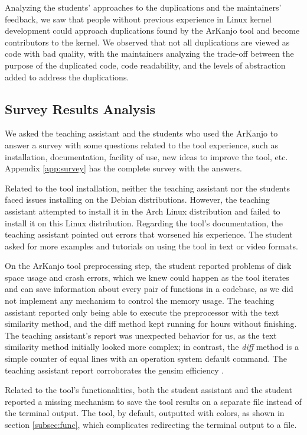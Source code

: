 Analyzing the students' approaches to the duplications and the maintainers' feedback, we saw that 
people without previous experience in Linux kernel development could approach duplications found 
by the ArKanjo tool and become contributors to the kernel. We observed that not all duplications 
are viewed as code with bad quality, with the maintainers analyzing the trade-off between the 
purpose of the duplicated code, code readability, and the levels of abstraction added to 
address the duplications.

\subsection{Survey Results Analysis}

We asked the teaching assistant and the students who used the ArKanjo to answer a survey with 
some questions related to the tool experience, such as installation, documentation, facility of 
use, new ideas to improve the tool, etc. Appendix \ref{app:survey} has the complete survey 
with the answers.

Related to the tool installation, neither the teaching assistant nor the students faced issues 
installing on the Debian distributions. However, the teaching assistant attempted to install it 
in the Arch Linux distribution and failed to install it on this Linux distribution. 
Regarding the tool's documentation, the teaching assistant pointed out errors that worsened his 
experience. The student asked for more examples and tutorials on using the tool in text or 
video formats.

On the ArKanjo tool preprocessing step, the student reported problems of disk space usage and 
crash errors, which we knew could happen as the tool iterates and can save information about 
every pair of functions in a codebase, as we did not implement any mechanism to control the 
memory usage. The teaching assistant reported only being able to execute the preprocessor with 
the text similarity method, and the diff method kept running for hours without finishing. 
The teaching assistant's report was unexpected behavior for us, as the text similarity method 
initially looked more complex; in contrast, the \textit{diff} method is a simple counter of equal lines 
with an operation system default command. The teaching assistant report corroborates the 
gensim efficiency \citep{gensim}.

Related to the tool's functionalities, both the student assistant and the student reported 
a missing mechanism to save the tool results on a separate file instead of the terminal output. 
The tool, by default, outputted with colors, as shown in section \ref{subsec:func}, which complicates 
redirecting the terminal output to a file.

